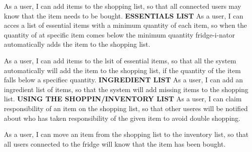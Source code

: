\documentclass[12pt]{article}
\begin{document}
As a user, I can add items to the shopping list, so that all connected users may know that the item needs to be bought.
\newline
\newline
\textbf{ESSENTIALS LIST}
As a user, I can acces a list of essential items with a minimum quantity of each item, so when the quantity of at specific item comes below the minimum quantity fridge-i-nator automatically adds the item to the shopping list.

As a user, I can add items to the lsit of essential items, so that all the system automatically will add the item to the shopping list, if the quantity of the item falls below a specifiec quantity.
\newline
\newline
\textbf{INGREDIENT LIST}
As a user, I can add an ingredient list of items, so that the system will add missing items to the shopping list.
\newline
\newline
\textbf{USING THE SHOPPIN/INVENTORY LIST}
As a user, I can claim responsibility of an item on the shopping list, so that other useres will be notified about who has taken responsibility of the given item to avoid double shopping.

As a user, I can move an item from the shopping list to the inventory list, so that all users connected to the fridge will know that the item has been bought.
\end{document}
